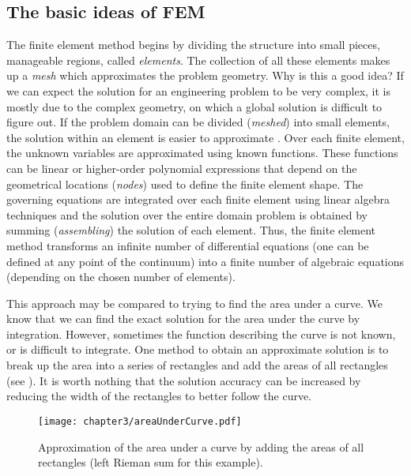 	\subsection{The basic ideas of FEM}
The finite element method begins by dividing the structure into small pieces, manageable regions, called \emph{elements}. The collection of all these elements makes up a \emph{mesh} which approximates the problem geometry. Why is this a good idea? If we can expect the solution for an engineering problem to be very complex, it is mostly due to the complex geometry, on which a global solution is difficult to figure out. If the problem domain can be divided (\emph{meshed}) into small elements, the solution within an element is easier to approximate \citep{MacDonald07}. Over each finite element, the unknown variables are approximated using known functions. These functions can be linear or higher-order polynomial expressions that depend on the geometrical locations (\emph{nodes}) used to define the finite element shape. The governing equations are integrated over each finite element using linear algebra techniques and the solution over the entire domain problem is obtained by summing (\emph{assembling}) the solution of each element. Thus, the finite element method transforms an infinite number of differential equations (one can be defined at any point of the continuum) into a finite number of algebraic equations (depending on the chosen number of elements). 

This approach may be compared to trying to find the area under a curve. We know that we can find the exact solution for the area under the curve by integration. However, sometimes the function describing the curve is not known, or is difficult to integrate. One method to obtain an approximate solution is to break up the area into a series of rectangles and add the areas of all rectangles (see ). It is worth nothing that the solution accuracy can be increased by reducing the width of the rectangles to better follow the curve. 
%
\begin{figure}[ht]
\begin{center}
\texttt{[image: chapter3/areaUnderCurve.pdf]}
\end{center}
\caption[Approximation of the area under a curve]{Approximation of the area under a curve by adding the areas of all rectangles (left Rieman sum for this example).}
\label{chap3:fig-areaUnderCurve}
\end{figure}

